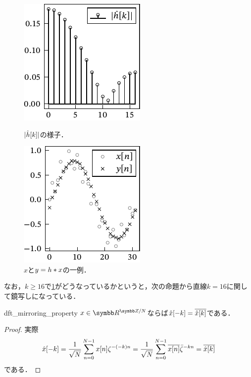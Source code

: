 \documentclass[../../main]{subfiles}
\begin{document}
\begin{figure}[htbp]
  \begin{minipage}{\linewidth/2}
    \centering
    \includegraphics{figures/filter_characteristics.pdf}
    \caption{\(\lvert\hat{h}[k]\rvert\)の様子．}
    \label{figure:filter_characteristics}
    \end{minipage}%
  \begin{minipage}{\linewidth/2}
    \centering
    \includegraphics{figures/filtering.pdf}
    \caption{\(x\)と\(y=h\ast x\)の一例．}
  \end{minipage}
\end{figure}

なお，\(k\geq 16\)で\cref{figure:filter_characteristics}がどうなっているかというと，次の命題から直線\(k=16\)に関して鏡写しになっている．

\begin{proposition}{}{dft_mirroring_property}
  \(x\in\cycles{\numset{R}}{N}\)ならば\(\hat{x}[-k]=\conj*{\hat{x}[k]}\)である．
\end{proposition}

\begin{proof}
  実際
  \[
    \hat{x}[-k] = \frac{1}{\sqrt{N}}\sum_{n=0}^{N-1}x[n]\zeta^{-(-k)n}
    = \frac{1}{\sqrt{N}}\sum_{n=0}^{N-1}\conj*{x[n]}\conj{\zeta}^{-kn}
    = \conj*{\hat{x}[k]}
  \]
  である．
\end{proof}
\end{document}

